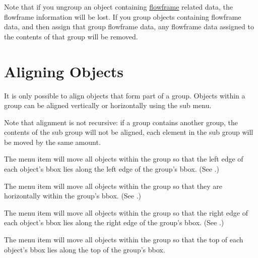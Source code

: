 \begin{warning}
Note that if you ungroup an \gls*{object} containing
\hyperref[sec:flowframe]{flowframe} related
data, the \gls{flowframe} information will be lost. If you group objects
containing flowframe data, and then assign that group flowframe data,
any flowframe data assigned to the contents of that group will be
removed.
\end{warning}



\section{Aligning Objects}\label{sec:alignobjects}


It is only possible to align \glspl{object} that form part of a
\gls{group}. Objects within a group can be aligned vertically or
horizontally using the  sub menu.

Note that alignment is not recursive: if a group contains another
group, the contents of the sub group will not be aligned, each
element in the sub group will be moved by the same amount.


The  menu item will move all objects
within the \gls{group} so that the left edge of each object's \gls{bbox}
lies along the left edge of the group's \gls*{bbox}.  (See
.)


The  menu item will move all objects
within the \gls{group} so that they are  horizontally
within the group's \gls*{bbox}.  (See .)


The  menu item will move all objects
within the \gls{group} so that the right edge of each object's \gls*{bbox}
lies along the right edge of the group's \gls*{bbox}.  (See
.)


The  menu item will move all objects
within the \gls{group} so that the top of each object's \gls*{bbox} lies along the
top of the group's \gls*{bbox}.

